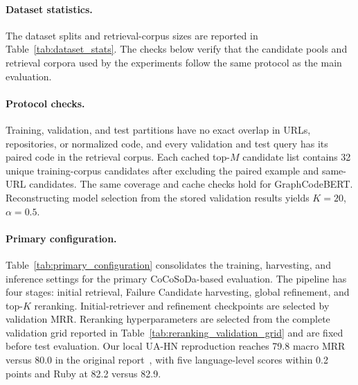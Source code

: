 \documentclass[11pt]{article}
\begin{document}
\paragraph{Dataset statistics.}
The dataset splits and retrieval-corpus sizes are reported in Table~\ref{tab:dataset_stats}. The checks below verify that the candidate pools and retrieval corpora used by the experiments follow the same protocol as the main evaluation.

\paragraph{Protocol checks.}
Training, validation, and test partitions have no exact overlap in URLs, repositories, or normalized code, and every validation and test query has its paired code in the retrieval corpus. Each cached top-\(M\) candidate list contains 32 unique training-corpus candidates after excluding the paired example and same-URL candidates. The same coverage and cache checks hold for GraphCodeBERT. Reconstructing model selection from the stored validation results yields \(K=20\), \(\alpha=0.5\).

\paragraph{Primary configuration.}
Table~\ref{tab:primary_configuration} consolidates the training, harvesting, and inference settings for the primary CoCoSoDa-based evaluation. The pipeline has four stages: initial retrieval, Failure Candidate harvesting, global refinement, and top-$K$ reranking. Initial-retriever and refinement checkpoints are selected by validation MRR. Reranking hyperparameters are selected from the complete validation grid reported in Table~\ref{tab:reranking_validation_grid} and are fixed before test evaluation. Our local UA-HN reproduction reaches 79.8 macro MRR versus 80.0 in the original report~\citep{AAAIUA}, with five language-level scores within 0.2 points and Ruby at 82.2 versus 82.9.
\end{document}
